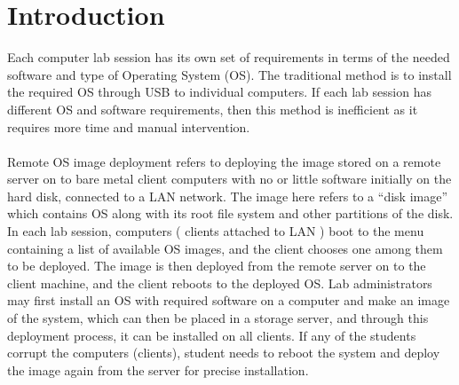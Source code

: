 \documentclass[a4paper,12pt]{article}
\begin{document}

\newpage
\tableofcontents


\newpage
\listoffigures
\listoftables


\newpage    
        


\section{\fontsize{16pt}{1em} Introduction}
Each computer lab session has its own set of requirements in terms of the needed software and type of Operating System (OS). The traditional method is to install the required OS through USB to individual computers. If each lab session has different OS and software requirements, then this method is inefficient as it requires more time and manual intervention.
\paragraph{}
Remote OS image deployment refers to deploying the image stored on a remote server on to bare metal client computers with no or little software initially on the hard disk,  connected to a LAN  network. The image here refers to a “disk image” which contains OS along with its root file system and other partitions of the disk. 
In each lab session, computers ( clients attached to LAN ) boot to the menu containing a list of available OS images, and the client chooses one among them to be deployed. The image is then deployed from the remote server on to the client machine, and the client reboots to the deployed OS. Lab administrators may first install an OS with required software on a computer and make an image of the system, which can then be placed in a storage server, and through this deployment process, it can be installed on all clients. If any of the students corrupt the computers (clients), student needs to reboot the system and deploy the image again from the server for precise installation. 
\vspace{0.5cm}
\end{document}

